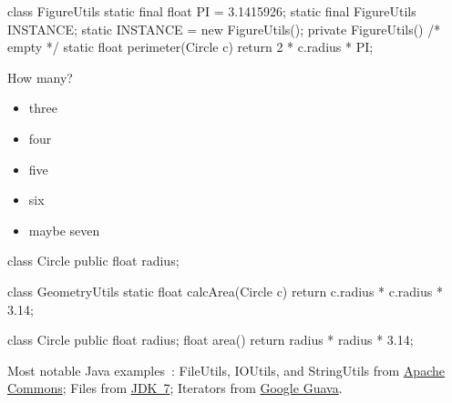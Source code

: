 \documentclass{article}
\begin{document}

\pptToc


\begin{pptWide}{2}
{\small\begin{ffcode}
class FigureUtils {
  static final float PI = 3.1415926;
  static final FigureUtils INSTANCE;
  static {
    INSTANCE = new FigureUtils();
  }
  private FigureUtils() { /* empty */ }
  static float perimeter(Circle c) {
    return 2 * c.radius * PI;
  }
}
\end{ffcode}
}
\par\columnbreak\par
How many?
\begin{itemize}
\item three
\item four
\item five
\item six
\item maybe seven
\end{itemize}
\end{pptWide}
\plush{}


\begin{pptWide}{2}
{\small\begin{ffcode}
class Circle {
  public float radius;
}

class GeometryUtils {
  static float calcArea(Circle c) {
    return c.radius * c.radius * 3.14;
  }
}
\end{ffcode}
}
\par\columnbreak\par
{\small\begin{ffcode}
class Circle {
  public float radius;
  float area() {
    return radius * radius * 3.14;
  }
}
\end{ffcode}
}
\end{pptWide}
\par
Most notable Java examples~\citep{bugayenko2015blog0220}:
FileUtils, IOUtils, and StringUtils from
\href{https://commons.apache.org/}{Apache Commons};
Files from \href{https://openjdk.org/projects/jdk7/}{JDK~7};
Iterators from \href{https://github.com/google/guava}{Google Guava}.
\plush{}

\end{document}
